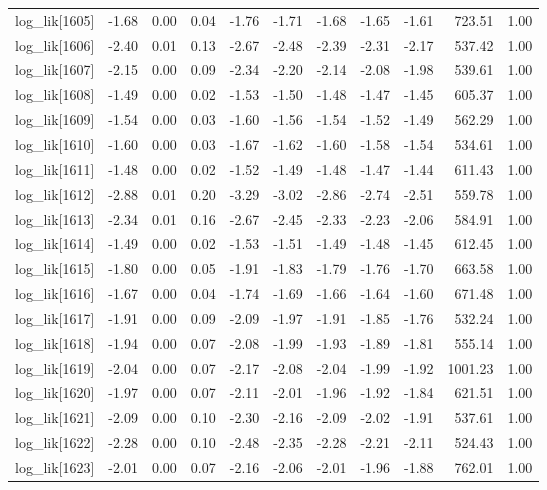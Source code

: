 \begin{table}[ht]
\begin{tabular}{rrrrrrrrrrr}
  log\_lik[1605] & -1.68 & 0.00 & 0.04 & -1.76 & -1.71 & -1.68 & -1.65 & -1.61 & 723.51 & 1.00 \\ 
  log\_lik[1606] & -2.40 & 0.01 & 0.13 & -2.67 & -2.48 & -2.39 & -2.31 & -2.17 & 537.42 & 1.00 \\ 
  log\_lik[1607] & -2.15 & 0.00 & 0.09 & -2.34 & -2.20 & -2.14 & -2.08 & -1.98 & 539.61 & 1.00 \\ 
  log\_lik[1608] & -1.49 & 0.00 & 0.02 & -1.53 & -1.50 & -1.48 & -1.47 & -1.45 & 605.37 & 1.00 \\ 
  log\_lik[1609] & -1.54 & 0.00 & 0.03 & -1.60 & -1.56 & -1.54 & -1.52 & -1.49 & 562.29 & 1.00 \\ 
  log\_lik[1610] & -1.60 & 0.00 & 0.03 & -1.67 & -1.62 & -1.60 & -1.58 & -1.54 & 534.61 & 1.00 \\ 
  log\_lik[1611] & -1.48 & 0.00 & 0.02 & -1.52 & -1.49 & -1.48 & -1.47 & -1.44 & 611.43 & 1.00 \\ 
  log\_lik[1612] & -2.88 & 0.01 & 0.20 & -3.29 & -3.02 & -2.86 & -2.74 & -2.51 & 559.78 & 1.00 \\ 
  log\_lik[1613] & -2.34 & 0.01 & 0.16 & -2.67 & -2.45 & -2.33 & -2.23 & -2.06 & 584.91 & 1.00 \\ 
  log\_lik[1614] & -1.49 & 0.00 & 0.02 & -1.53 & -1.51 & -1.49 & -1.48 & -1.45 & 612.45 & 1.00 \\ 
  log\_lik[1615] & -1.80 & 0.00 & 0.05 & -1.91 & -1.83 & -1.79 & -1.76 & -1.70 & 663.58 & 1.00 \\ 
  log\_lik[1616] & -1.67 & 0.00 & 0.04 & -1.74 & -1.69 & -1.66 & -1.64 & -1.60 & 671.48 & 1.00 \\ 
  log\_lik[1617] & -1.91 & 0.00 & 0.09 & -2.09 & -1.97 & -1.91 & -1.85 & -1.76 & 532.24 & 1.00 \\ 
  log\_lik[1618] & -1.94 & 0.00 & 0.07 & -2.08 & -1.99 & -1.93 & -1.89 & -1.81 & 555.14 & 1.00 \\ 
  log\_lik[1619] & -2.04 & 0.00 & 0.07 & -2.17 & -2.08 & -2.04 & -1.99 & -1.92 & 1001.23 & 1.00 \\ 
  log\_lik[1620] & -1.97 & 0.00 & 0.07 & -2.11 & -2.01 & -1.96 & -1.92 & -1.84 & 621.51 & 1.00 \\ 
  log\_lik[1621] & -2.09 & 0.00 & 0.10 & -2.30 & -2.16 & -2.09 & -2.02 & -1.91 & 537.61 & 1.00 \\ 
  log\_lik[1622] & -2.28 & 0.00 & 0.10 & -2.48 & -2.35 & -2.28 & -2.21 & -2.11 & 524.43 & 1.00 \\ 
  log\_lik[1623] & -2.01 & 0.00 & 0.07 & -2.16 & -2.06 & -2.01 & -1.96 & -1.88 & 762.01 & 1.00 \\ 

\end{tabular}
\end{table}
